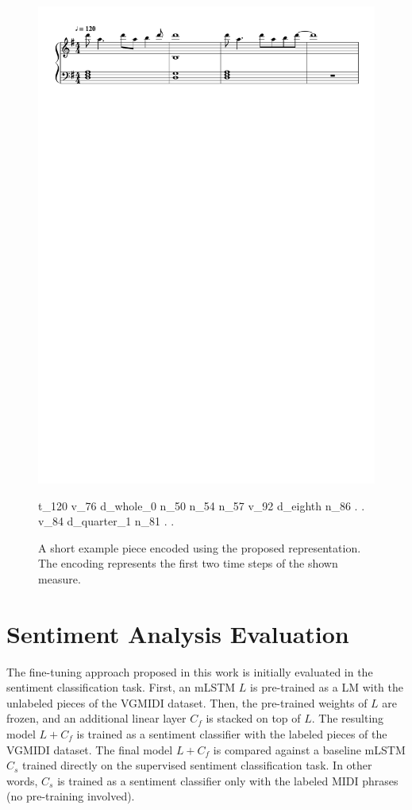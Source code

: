 \begin{figure}[!h]
 \centering
 \includegraphics[width=.9\columnwidth]{imgs/ismir19/encoding.pdf}
\begin{spverbatim}
        t_120 v_76 d_whole_0 n_50 n_54 n_57 v_92 d_eighth n_86 . . v_84
        d_quarter_1 n_81 . .
\end{spverbatim}

 \caption{A short example piece encoded using the proposed representation. The encoding represents the first two time steps of the shown measure.}
 \label{fig:enc_ex}
\end{figure}

\section{Sentiment Analysis Evaluation}

The fine-tuning approach proposed in this work is initially evaluated in the sentiment classification task. First, an mLSTM $L$ is pre-trained as a LM with the unlabeled pieces of the VGMIDI dataset. Then, the pre-trained weights of $L$ are frozen, and an additional linear layer $C_f$ is stacked on top of $L$. The resulting model $L + C_f$ is trained as a sentiment classifier with the labeled pieces of the VGMIDI dataset. The final model $L + C_f$ is compared against a baseline mLSTM $C_s$ trained directly on the supervised sentiment classification task. In other words, $C_s$ is trained as a sentiment classifier only with the labeled MIDI phrases (no pre-training involved).

